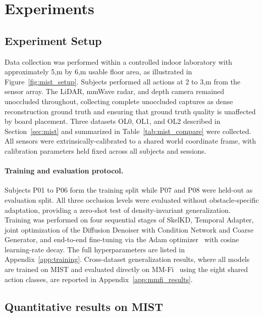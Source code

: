 \documentclass{article}
\begin{document}
\section{Experiments}
\label{sec:exp}

\subsection{Experiment Setup}
\label{sec:setup}

Data collection was performed within a controlled indoor laboratory with
approximately 5,m by 6,m usable floor area, as illustrated in
Figure~\ref{fig:mist_setup}.
Subjects performed all actions at 2 to 3,m from the sensor array.
The LiDAR, mmWave radar, and depth camera remained unoccluded
throughout, collecting complete unoccluded captures as dense reconstruction ground truth and ensuring that ground truth quality is unaffected by board placement. Three datasets OL0, OL1, and OL2 described in Section~\ref{sec:mist} and summarized in Table~\ref{tab:mist_compare} were collected. All sensors were extrinsically-calibrated to a shared world coordinate frame,
with calibration parameters held fixed across all subjects and sessions.

\paragraph{Training and evaluation protocol.}
Subjects P01 to P06 form the training split while P07 and P08 were held-out as evaluation split. All three occlusion levels were evaluated without obstacle-specific adaptation, providing a zero-shot test of density-invariant generalization. Training was performed on four sequential stages of SkelKD, Temporal Adapter, joint optimization of the Diffusion Denoiser with Condition Network and Coarse Generator,
and end-to-end fine-tuning via the Adam optimizer~\cite{kingma2014adam} with cosine learning-rate
decay. The full hyperparameters are listed in Appendix~\ref{app:training}. Cross-dataset generalization results, where all models are trained on
MIST and evaluated directly on MM-Fi~\cite{yang2023mm} using the
eight shared action classes, are reported in Appendix~\ref{app:mmfi_results}.


\subsection{Quantitative results on MIST}
\label{sec:quant}
\end{document}
